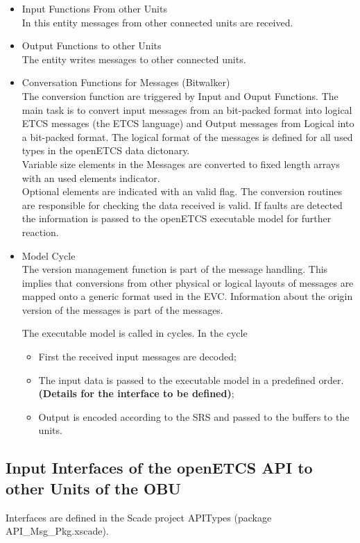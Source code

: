 \documentclass{template/openetcs_report}
\begin{document}
\begin{itemize}
\item Input Functions From other Units\\
In this entity messages from other connected units are received.
\item Output Functions to other Units\\
The entity writes messages to other connected units.
\item Conversation Functions for Messages (Bitwalker)\\
The conversion function are triggered by Input and Ouput Functions. The main task is to convert input messages from an bit-packed format into logical ETCS messages (the ETCS language) and Output messages from Logical into a bit-packed format. The logical format of the messages is defined for all used types in the openETCS data dictonary. \\
Variable size elements in the Messages are converted to fixed length arrays with an used elements indicator.\\
Optional elements are indicated with an valid flag.
The conversion routines are responsible for checking the data received is valid. If  faults are detected the information is passed to the openETCS executable model for further reaction. 
\item Model Cycle\\

The version management function is part of the message handling. This implies that conversions from other physical or logical layouts of messages are mapped onto a generic format used in the EVC. Information about the origin version of the messages is part of the messages.
 
The executable model is called in cycles. In the cycle 
\begin{itemize}
\item First the received input messages are decoded;
\item The input data is passed to the executable model in a predefined order. \textbf{(Details for the interface to be defined)};
\item Output is encoded according to the \gls{SRS} and passed to the  buffers to the units.
\end{itemize}
\end{itemize}

\subsection{Input Interfaces of the openETCS API to other Units of the OBU}
Interfaces are defined in the Scade project APITypes (package API\_Msg\_Pkg.xscade).
\end{document}
